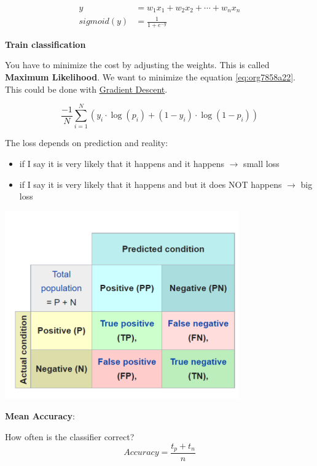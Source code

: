 \documentclass[11pt,landscape]{article}
\begin{document}
\begin{multicols}{3}
\begin{align}
  y &= w_1x_1 + w_2x_2 + \cdots + w_nx_n \\
  sigmoid(y) &= \frac{1}{1 + e^{-y}}
\end{align}


\textbf{Train classification}

You have to minimize the cost by adjusting the weights.
This is called \textbf{Maximum Likelihood}.
We want to minimize the equation \ref{eq:org7858a22}.
This could be done with \href{../../../roam/20211208163604-gradient_descent.org}{Gradient Descent}.

\begin{equation}
\label{eq:org7858a22}
  \frac{-1}{N}\sum_{i=1}^{N}(y_i \cdot \log(p_i) + (1 - y_i)\cdot \log(1-p_i))
\end{equation}

The loss depends on prediction and reality:
\begin{itemize}
\item if I say it is very likely that it happens and it happens \(\rightarrow\) small loss
\item if I say it is very likely that it happens and but it does NOT happens \(\rightarrow\) big loss
\end{itemize}

\begin{center}
\includegraphics[width=.9\linewidth]{img/confusion_matrix.png}
\end{center}


\textbf{Mean Accuracy}:

How often is the classifier correct?
\begin{equation}
Accuracy = \frac{t_p + t_n}{n}
\end{equation}


\end{multicols}
\end{document}
